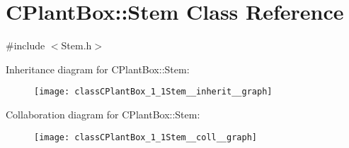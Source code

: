 \hypertarget{classCPlantBox_1_1Stem}{}\section{C\+Plant\+Box\+:\+:Stem Class Reference}
\label{classCPlantBox_1_1Stem}


{\ttfamily \#include $<$Stem.\+h$>$}



Inheritance diagram for C\+Plant\+Box\+:\+:Stem\+:\nopagebreak
\begin{figure}[H]
\begin{center}
\leavevmode
\texttt{[image: classCPlantBox\_1\_1Stem\_\_inherit\_\_graph]}
\end{center}
\end{figure}


Collaboration diagram for C\+Plant\+Box\+:\+:Stem\+:\nopagebreak
\begin{figure}[H]
\begin{center}
\leavevmode
\texttt{[image: classCPlantBox\_1\_1Stem\_\_coll\_\_graph]}
\end{center}
\end{figure}
